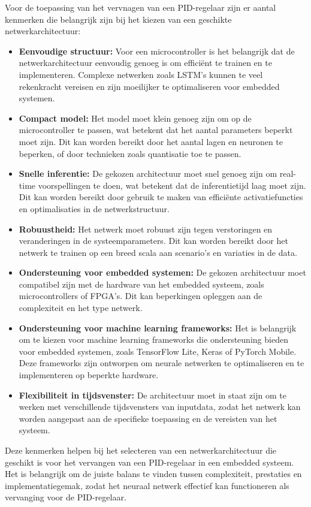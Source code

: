 Voor de toepassing van het vervnagen van een PID-regelaar zijn er aantal kenmerken die belangrijk zijn bij het kiezen van een geschikte netwerkarchitectuur:
\begin{itemize}
  \item \textbf{Eenvoudige structuur:} Voor een microcontroller is het belangrijk dat de netwerkarchitectuur eenvoudig genoeg is om efficiënt te trainen en te implementeren. Complexe netwerken zoals LSTM's kunnen te veel rekenkracht vereisen en zijn moeilijker te optimaliseren voor embedded systemen.
  \item \textbf{Compact model:} Het model moet klein genoeg zijn om op de microcontroller te passen, wat betekent dat het aantal parameters beperkt moet zijn. Dit kan worden bereikt door het aantal lagen en neuronen te beperken, of door technieken zoals quantisatie toe te passen.
  \item \textbf{Snelle inferentie:} De gekozen architectuur moet snel genoeg zijn om real-time voorspellingen te doen, wat betekent dat de inferentietijd laag moet zijn. Dit kan worden bereikt door gebruik te maken van efficiënte activatiefuncties en optimalisaties in de netwerkstructuur.
  \item \textbf{Robuustheid:} Het netwerk moet robuust zijn tegen verstoringen en veranderingen in de systeemparameters. Dit kan worden bereikt door het netwerk te trainen op een breed scala aan scenario's en variaties in de data.
  \item \textbf{Ondersteuning voor embedded systemen:} De gekozen architectuur moet compatibel zijn met de hardware van het embedded systeem, zoals microcontrollers of FPGA's. Dit kan beperkingen opleggen aan de complexiteit en het type netwerk.
  \item \textbf{Ondersteuning voor machine learning frameworks:} Het is belangrijk om te kiezen voor machine learning frameworks die ondersteuning bieden voor embedded systemen, zoals TensorFlow Lite, Keras of PyTorch Mobile. Deze frameworks zijn ontworpen om neurale netwerken te optimaliseren en te implementeren op beperkte hardware.
  \item \textbf{Flexibiliteit in tijdsvenster:} De architectuur moet in staat zijn om te werken met verschillende tijdsvensters van inputdata, zodat het netwerk kan worden aangepast aan de specifieke toepassing en de vereisten van het systeem.
\end{itemize}
Deze kenmerken helpen bij het selecteren van een netwerkarchitectuur die geschikt is voor het vervangen van een PID-regelaar in een embedded systeem. Het is belangrijk om de juiste balans te vinden tussen complexiteit, prestaties en implementatiegemak, zodat het neuraal netwerk effectief kan functioneren als vervanging voor de PID-regelaar.


